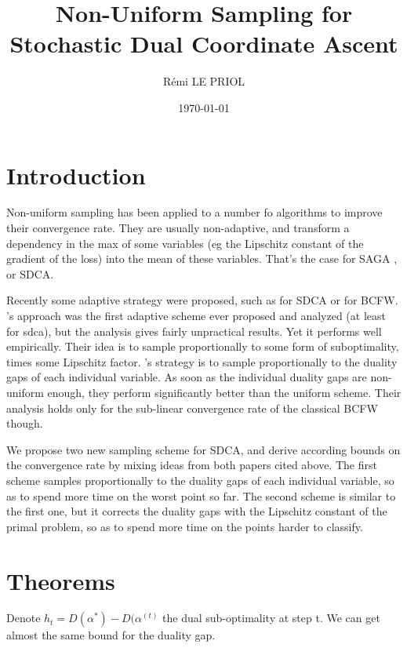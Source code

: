 \documentclass{article}
\title{Non-Uniform Sampling for \\ Stochastic Dual Coordinate Ascent}
\author{R\'emi LE PRIOL}
\affil{Montreal Institute of Learning Algorithms}
\date{\today}
\DeclareMathOperator{\1}{\mathbb{1}}
\begin{document}
\maketitle

\section{Introduction}

Non-uniform sampling has been applied to a number fo algorithms to improve their convergence rate. 
They are usually non-adaptive, and transform a dependency in the max of some variables (eg the Lipschitz constant of the gradient of the loss) into  the mean of these variables.
That's the case for SAGA \cite{schmidt2015non}, or SDCA\cite{richtarik}.

Recently some adaptive strategy were proposed, such as \cite{csiba2015stochastic} for SDCA or \cite{osokin2016minding} for BCFW.
\cite{csiba2015stochastic} 's approach was the first adaptive scheme ever proposed and analyzed (at least for sdca), but the analysis gives fairly unpractical results.
Yet it performs well empirically.
Their idea is to sample proportionally to some form of suboptimality, times some Lipschitz factor.
\cite{osokin2016minding} 's strategy is to sample proportionally to the duality gaps of each individual variable. 
As soon as the individual duality gaps are non-uniform enough, they perform significantly better than the uniform scheme.
Their analysis holds only for the sub-linear convergence rate of the classical BCFW though. 

We propose two new sampling scheme for SDCA, and derive according bounds on the convergence rate by mixing ideas from both papers cited above. 
The first scheme samples proportionally to the duality gaps of each individual  variable, so as to spend more time on the worst point so far.
The second scheme is similar to the first one, but it corrects the duality gaps with the Lipschitz constant of the primal problem, so as to spend more time on the points harder to classify.

\section{Theorems}

Denote $h_t = D(\alpha^*) - D(\alpha^{(t)}$ the dual sub-optimality at step t. We can get almost the same bound for the duality gap.
\end{document}
